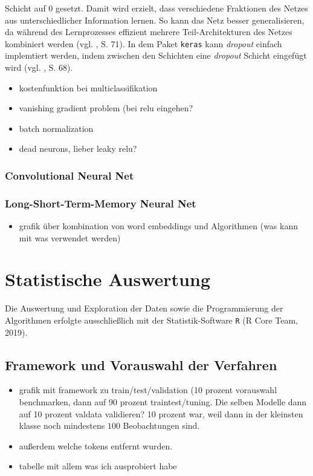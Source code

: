 \documentclass[a4paper,11pt]{article}
\begin{document}
Schicht auf $0$ gesetzt. Damit wird erzielt, dass verschiedene Fraktionen des Netzes aus unterschiedlicher Information lernen. So kann das Netz besser generalisieren, da während des Lernprozesses effizient mehrere Teil-Architekturen des Netzes kombiniert werden (vgl. \cite{deepEssentials}, S. 71). In dem Paket \texttt{keras} kann \textit{dropout} einfach implemtiert werden, indem zwischen den Schichten eine \textit{dropout} Schicht eingefügt wird (vgl. \cite{keras}, S. 68).

\begin{itemize}
    \item kostenfunktion bei multiclassifikation
    \item vanishing gradient problem (bei relu eingehen?
    \item batch normalization
    \item dead neurons, lieber leaky relu?
\end{itemize}{}



\subsubsection{Convolutional Neural Net}
\subsubsection{Long-Short-Term-Memory Neural Net}

\begin{itemize}
    \item grafik über kombination von word embeddings und Algorithmen (was kann mit was verwendet werden)
\end{itemize}{}


\section{Statistische Auswertung}\label{Kap:statAus}

Die Auswertung und Exploration der Daten sowie die Programmierung der Algorithmen erfolgte ausschließlich mit der Statistik-Software \texttt{R} (R Core Team, 2019).

\subsection{Framework und Vorauswahl der Verfahren}

\begin{itemize}
    \item grafik mit framework zu train/test/validation (10 prozent vorauswahl benchmarken, dann auf 90 prozent traintest/tuning. Die selben Modelle dann auf 10 prozent valdata validieren? 10 prozent war, weil dann in der kleinsten klasse noch mindestens $100$ Beobachtungen sind.
    \item außerdem welche tokens entfernt wurden.
    \item tabelle mit allem was ich ausprobiert habe
\end{itemize}{}
\end{document}
